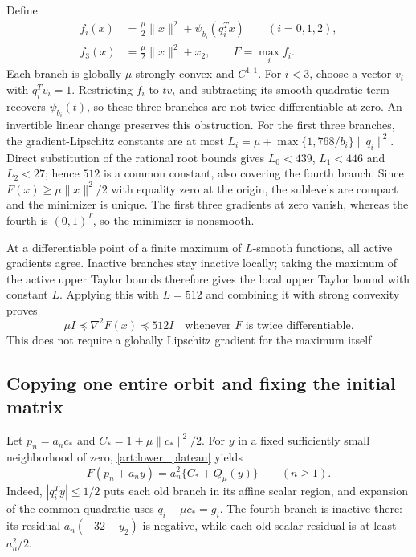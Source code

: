 Define
\begin{equation}\label{art:lower_objective}
 \begin{aligned}
 f_i(x)&=\tfrac\mu2\|x\|^2+\psi_{b_i}(q_i^Tx)\qquad(i=0,1,2),\\
 f_3(x)&=\tfrac\mu2\|x\|^2+x_2,\qquad F=\max_i f_i.
 \end{aligned}
\end{equation}
Each branch is globally $\mu$-strongly convex and $C^{1,1}$.
For $i<3$, choose a vector $v_i$ with $q_i^Tv_i=1$.
Restricting $f_i$ to $tv_i$ and subtracting its smooth quadratic term
recovers $\psi_{b_i}(t)$, so these three branches are not twice
differentiable at zero. An invertible linear change preserves this obstruction.
For the first three branches, the gradient-Lipschitz constants are at most
$L_i=\mu+\max\{1,768/b_i\}\|q_i\|^2$. Direct substitution of the
rational root bounds gives $L_0<439$, $L_1<446$ and $L_2<27$; hence
$512$ is a common constant, also covering the fourth branch.
Since $F(x)\ge\mu\|x\|^2/2$ with equality zero at the origin, the
sublevels are compact and the minimizer is unique. The first three
gradients at zero vanish, whereas the fourth is $(0,1)^T$, so the
minimizer is nonsmooth.

At a differentiable point of a finite maximum of $L$-smooth functions,
all active gradients agree. Inactive branches stay inactive locally;
taking the maximum of the active upper Taylor bounds therefore gives
the local upper Taylor bound with constant $L$. Applying this with
$L=512$ and combining it with strong convexity proves
\[
 \mu I\preceq\nabla^2F(x)\preceq512I
 \quad\text{whenever }F\text{ is twice differentiable}.
\]
This does not require a globally Lipschitz gradient for the maximum itself.

\subsection{Copying one entire orbit and fixing the initial matrix}
Let $p_n=a_nc_*$ and $C_*=1+\mu\|c_*\|^2/2$.
For $y$ in a fixed sufficiently small neighborhood of zero,
\eqref{art:lower_plateau} yields
\begin{equation}\label{art:lower_local_model}
 F(p_n+a_ny)=a_n^2\{C_*+Q_\mu(y)\}\qquad(n\ge1).
\end{equation}
Indeed, $|q_i^Ty|\le1/2$ puts each old branch in its affine scalar
region, and expansion of the common quadratic uses $q_i+\mu c_*=g_i$.
The fourth branch is inactive there: its residual $a_n(-32+y_2)$ is
negative, while each old scalar residual is at least $a_n^2/2$.

